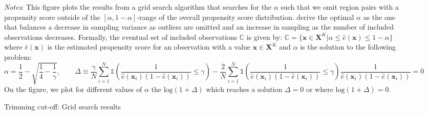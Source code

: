 \begin{figure}[H]
    \centering
    \caption{Trimming cut-off: Grid search results}
    \label{fig: app_prop_score_trimming_algo}
    \scalebox{0.85}{}
     \parbox{\textwidth}{
        \begin{spacing}{1} 
            {\footnotesize 
            \textit{Notes}: This figure plots the results from a grid search algorithm that searches for the $\alpha$ such that we omit region pairs with a propensity score outside of the $[\alpha,1-\alpha]$-range of the overall propensity score distribution. \citet{Crump2009} derive the optimal $\alpha$ as the one that balances a decrease in sampling variance as outliers are omitted and an increase in sampling as the number of included observations decreases. Formally, the eventual set of included observations $\mathbb{C}$ is given by: $\mathbb{C} = \{\boldsymbol{x} \in \boldsymbol{X}^{K} | \alpha \leq \hat{e}(\boldsymbol{x}) \leq 1-\alpha \}$ where $\hat{e}(\boldsymbol{x})$ is the estimated propensity score for an observation with a value $\boldsymbol{x} \in \boldsymbol{X}^{K}$ and $\alpha$ is the solution to the following problem: 
            \begin{equation*}
                \alpha = \frac{1}{2} - \sqrt{\frac{1}{4} - \frac{1}{\gamma}}, 
                \qquad 
                \Delta \equiv \frac{\gamma}{N}\sum_{i=1}^{N}\mathbb{1}\left(\frac{1}{\hat{e}(\boldsymbol{x}_i)(1-\hat{e}(\boldsymbol{x}_i))} \leq \gamma\right)
                    - \frac{2}{N}\sum_{i=1}^{N}\mathbb{1}\left(\frac{1}{\hat{e}(\boldsymbol{x}_i)(1-\hat{e}(\boldsymbol{x}_i))} \leq \gamma\right)
                        \frac{1}{\hat{e}(\boldsymbol{x}_i)(1-\hat{e}(\boldsymbol{x}_i))} = 0
            \end{equation*}
            On the figure, we plot for different values of $\alpha$ the $\text{log}(1+\Delta)$ which reaches a solution $\Delta = 0$ or where $\text{log}(1+\Delta) = 0$.}
        \end{spacing}}
 \end{figure} 


